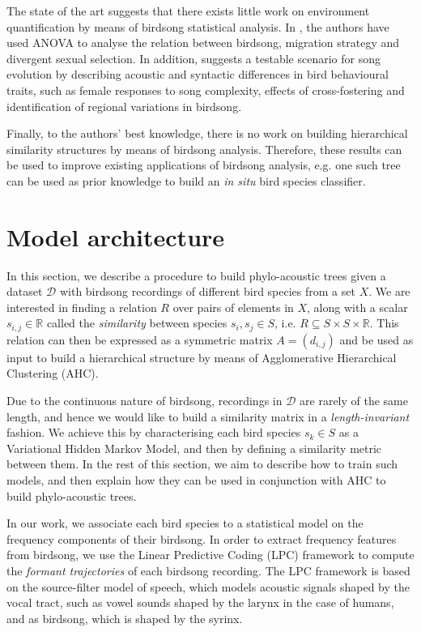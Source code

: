 \documentclass[pdftex,11pt,a4paper]{article}
\theoremstyle{definition}
\theoremstyle{remark}
\begin{document}
\par The state of the art suggests that there exists little work on environment quantification by means of birdsong statistical analysis. In \cite{Collins2009}, the authors have used ANOVA to analyse the relation between birdsong, migration strategy and divergent sexual selection. In addition, \cite{BolhuisJohanJ.andEveraertMartin2015} suggests a testable scenario for song evolution by describing acoustic and syntactic differences in bird behavioural traits, such as female responses to song complexity, effects of cross-fostering and identification of regional variations in birdsong.
\par Finally, to the authors' best knowledge, there is no work on building hierarchical similarity structures by means of birdsong analysis. Therefore, these results can be used to improve existing applications of birdsong analysis, e.g. one such tree can be used as prior knowledge to build an \emph{in situ} bird species classifier.

\section{Model architecture}
\label{section_model}
In this section, we describe a procedure to build phylo-acoustic trees given a dataset $\mathcal{D}$ with birdsong recordings of different bird species from a set $X$. We are interested in finding a relation $R$ over pairs of elements in $X$, along with a scalar $s_{i, j} \in \mathbb{R}$ called the \emph{similarity} between species $s_i, s_j \in S$, i.e. $R \subseteq S \times S \times \mathbb{R}$. This relation can then be expressed as a symmetric matrix $A = (d_{i,j})$ and be used as input to build a hierarchical structure by means of Agglomerative Hierarchical Clustering (AHC). 
\par Due to the continuous nature of birdsong, recordings in $\mathcal{D}$ are rarely of the same length, and hence we would like to build a similarity matrix in a \emph{length-invariant} fashion. We achieve this by characterising each bird species $s_k \in S$ as a Variational Hidden Markov Model, and then by defining a similarity metric between them. In the rest of this section, we aim to describe how to train such models, and then explain how they can be used in conjunction with AHC to build phylo-acoustic trees.
\par In our work, we associate each bird species to a statistical model on the frequency components of their birdsong. In order to extract frequency features from birdsong, we use the Linear Predictive Coding (LPC) framework to compute the \emph{formant trajectories} of each birdsong recording. The LPC framework is based on the source-filter model of speech, which models acoustic signals shaped by the vocal tract, such as vowel sounds shaped by the larynx in the case of humans, and as birdsong, which is shaped by the syrinx.
\end{document}

